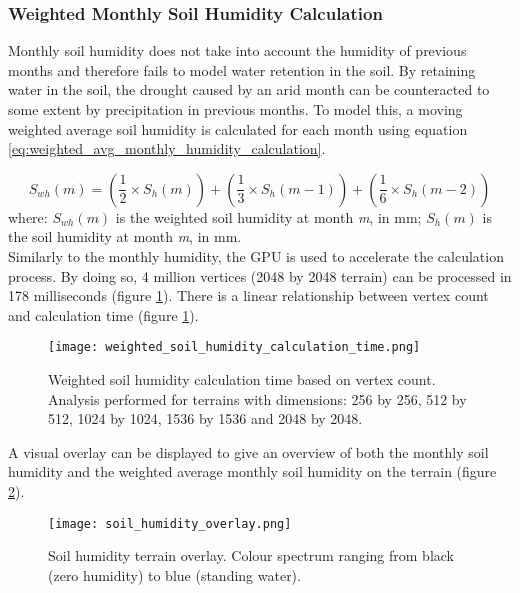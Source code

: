 \subsubsection{Weighted Monthly Soil Humidity Calculation}

Monthly soil humidity does not take into account the humidity of previous months and therefore fails to model water retention in the soil. By retaining water in the soil, the drought caused by an arid month can be counteracted to some extent by precipitation in previous months. To model this, a moving weighted average soil humidity is calculated for each month using equation \ref{eq:weighted_avg_monthly_humidity_calculation}.

\begin{equation} \label{eq:weighted_avg_monthly_humidity_calculation}
	S_{wh}(m) =  (\frac{1}{2} \times S_{h}(m)) + (\frac{1}{3} \times S_{h}(m-1)) + (\frac{1}{6} \times S_{h}(m-2))
\end{equation}
where: \textit{$S_{wh}(m)$} is the weighted soil humidity at month \textit{m}, in mm; \textit{$S_{h}(m)$} is the soil humidity at month \textit{m}, in mm. \\

Similarly to the monthly humidity, the GPU is used to accelerate the calculation process. By doing so, 4 million vertices (2048 by 2048 terrain) can be processed in 178 milliseconds (figure \ref{fig:weighted_soil_humidity_calculation_time}). There is a linear relationship between vertex count and calculation time (figure \ref{fig:weighted_soil_humidity_calculation_time}).

\begin{figure}
\center
	\texttt{[image: weighted\_soil\_humidity\_calculation\_time.png]}
	\caption{ Weighted soil humidity calculation time based on vertex count. Analysis performed for terrains with dimensions: 256 by 256, 512 by 512, 1024 by 1024, 1536 by 1536 and 2048 by 2048. }
	\label{fig:weighted_soil_humidity_calculation_time}
\end{figure}

A visual overlay can be displayed to give an overview of both the monthly soil humidity and the weighted average monthly soil humidity on the terrain (figure \ref{fig:soil_humidity_overlay}).

\begin{figure}
\center
	\texttt{[image: soil\_humidity\_overlay.png]}
	\caption{ Soil humidity terrain overlay. Colour spectrum ranging from black (zero humidity) to blue (standing water). }
	\label{fig:soil_humidity_overlay}
\end{figure}

